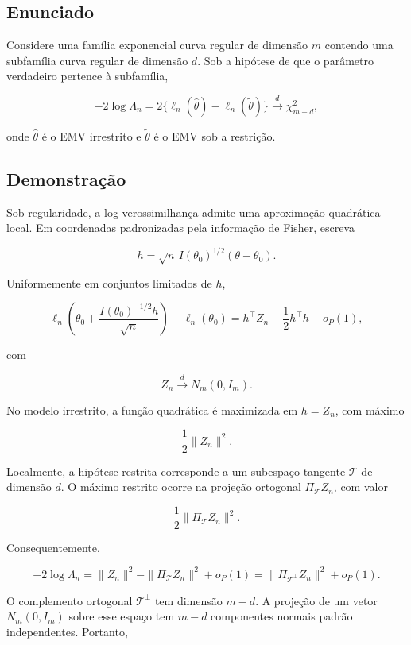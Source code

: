 \documentclass[
  letterpaper,
  DIV=11,
  numbers=noendperiod]{scrreprt}
\begin{document}

\subsection*{Enunciado}\label{enunciado-15}

Considere uma família exponencial curva regular de dimensão \(m\)
contendo uma subfamília curva regular de dimensão \(d\). Sob a hipótese
de que o parâmetro verdadeiro pertence à subfamília,

\[
-2\log\Lambda_n
=
2\{\ell_n(\widehat\theta)-\ell_n(\widetilde\theta)\}
\xrightarrow{d}
\chi^2_{m-d},
\]

onde \(\widehat\theta\) é o EMV irrestrito e \(\widetilde\theta\) é o
EMV sob a restrição.

\subsection*{Demonstração}\label{demonstrauxe7uxe3o-16}

Sob regularidade, a log-verossimilhança admite uma aproximação
quadrática local. Em coordenadas padronizadas pela informação de Fisher,
escreva

\[
h=\sqrt n\,I(\theta_0)^{1/2}(\theta-\theta_0).
\]

Uniformemente em conjuntos limitados de \(h\),

\[
\ell_n\left(\theta_0+\frac{I(\theta_0)^{-1/2}h}{\sqrt n}\right)
-
\ell_n(\theta_0)
=
h^\top Z_n-\frac12h^\top h+o_P(1),
\]

com

\[
Z_n\xrightarrow{d}N_m(0,I_m).
\]

No modelo irrestrito, a função quadrática é maximizada em \(h=Z_n\), com
máximo

\[
\frac12\|Z_n\|^2.
\]

Localmente, a hipótese restrita corresponde a um subespaço tangente
\(\mathcal T\) de dimensão \(d\). O máximo restrito ocorre na projeção
ortogonal \(\Pi_{\mathcal T}Z_n\), com valor

\[
\frac12\|\Pi_{\mathcal T}Z_n\|^2.
\]

Consequentemente,

\[
-2\log\Lambda_n
=
\|Z_n\|^2-
\|\Pi_{\mathcal T}Z_n\|^2+o_P(1)
=
\|\Pi_{\mathcal T^\perp}Z_n\|^2+o_P(1).
\]

O complemento ortogonal \(\mathcal T^\perp\) tem dimensão \(m-d\). A
projeção de um vetor \(N_m(0,I_m)\) sobre esse espaço tem \(m-d\)
componentes normais padrão independentes. Portanto,
\end{document}
